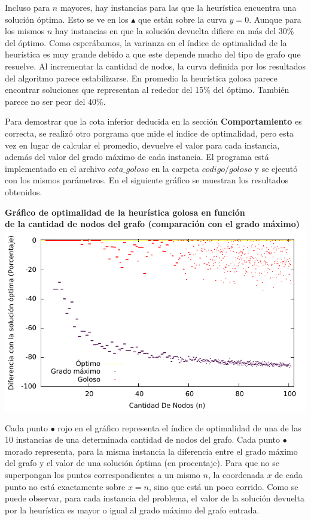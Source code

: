 \par{Incluso para $n$ mayores, hay instancias para las que la
heurística encuentra una solución óptima. Esto se ve en los $\blacktriangle$
que están sobre la curva $y=0$. Aunque para los mismos $n$ hay instancias en
que la solución devuelta difiere en más del 30\% del óptimo. Como esperábamos,
la varianza en el índice de optimalidad de la heurística es muy grande debido
a que este depende mucho del tipo de grafo que resuelve. Al incrementar la
cantidad de nodos, la curva definida por los resultados del algoritmo
parece estabilizarse. En promedio la heurística golosa parece encontrar
soluciones que representan al rededor del 15\% del óptimo. También parece
no ser peor del 40\%.}\\

\par{Para demostrar que la cota inferior deducida en la sección
\textbf{Comportamiento} es correcta, se realizó otro porgrama que mide el
índice de optimalidad, pero esta vez en lugar de calcular el promedio,
devuelve el valor para cada instancia, además del valor del grado máximo de
cada instancia. El programa está implementado en el archivo $cota\_goloso$ en
la carpeta $codigo/goloso$ y se ejecutó con los mismos parámetros.
En el siguiente gráfico se muestran los resultados obtenidos.}
\newpage
\begin{center}
\textbf{Gráfico de optimalidad de la heurística golosa en función\\de la cantidad
de nodos del grafo (comparación con el grado máximo)}
\includegraphics[scale=1.3]{imgs/cota_goloso_100_1_10.pdf}
\end{center}

\par{Cada punto $\bullet$ rojo en el gráfico representa el índice de
optimalidad de una de las 10 instancias de una determinada cantidad de
nodos del grafo. Cada punto $\bullet$ morado representa, para la misma
instancia la diferencia entre el grado máximo del grafo y el valor de una
solución óptima (en procentaje). Para que no se superpongan los puntos
correspondientes a un mismo $n$, la coordenada $x$ de cada punto
no está exactamente sobre $x=n$, sino que está un poco corrido. Como se puede
observar, para cada instancia del problema, el valor de la solución devuelta
por la heurística es mayor o igual al grado máximo del grafo entrada.}
